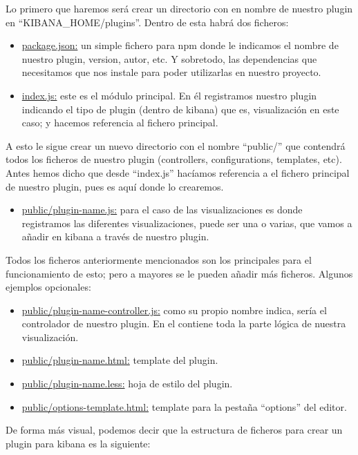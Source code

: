 \documentclass[a4paper, 12pt]{book}
\begin{document}
Lo primero que haremos será crear un directorio con en nombre de nuestro plugin en “KIBANA\_HOME/plugins”. Dentro de esta habrá dos ficheros:

\begin{itemize}
    \item \underline{package.json:} un simple fichero para npm donde le indicamos el nombre de nuestro plugin, version, autor, etc. Y sobretodo, las dependencias que necesitamos que nos instale para poder utilizarlas en nuestro proyecto.
    \item \underline{index.js:} este es el módulo principal. En él registramos nuestro plugin indicando el tipo de plugin (dentro de kibana) que es, visualización en este caso; y hacemos referencia al fichero principal.
\end{itemize}

A esto le sigue crear un nuevo directorio con el nombre “public/” que contendrá todos los ficheros de nuestro plugin (controllers, configurations, templates, etc). Antes hemos dicho que desde “index.js” hacíamos referencia a el fichero principal de nuestro plugin, pues es aquí donde lo crearemos.

\begin{itemize}
    \item \underline{public/plugin-name.js:} para el caso de las visualizaciones es donde registramos las diferentes visualizaciones, puede ser una o varias, que vamos a añadir en kibana a través de nuestro plugin.
\end{itemize}

Todos los ficheros anteriormente mencionados son los principales para el funcionamiento de esto; pero a mayores se le pueden añadir más ficheros. Algunos ejemplos opcionales:

\begin{itemize}
    \item \underline{public/plugin-name-controller.js:} como su propio nombre indica, sería el controlador de nuestro plugin. En el contiene toda la parte lógica de nuestra visualización.
    \item \underline{public/plugin-name.html:} template del plugin.
    \item \underline{public/plugin-name.less:} hoja de estilo del plugin.
    \item \underline{public/options-template.html:} template para la pestaña “options” del editor.
\end{itemize}

De forma más visual, podemos decir que la estructura de ficheros para crear un plugin para kibana es la siguiente:
\end{document}
